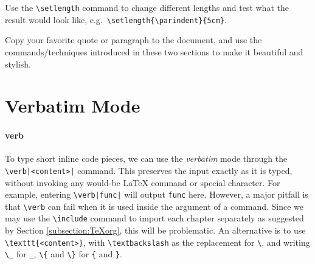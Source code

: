 \begin{exercisebox}
\begin{Exercise}
Use the \texttt{\textbackslash setlength} command to change different lengths and test what the result would look like, e.g.\ \texttt{\textbackslash setlength\{\textbackslash parindent\}\{5cm\}}.
\end{Exercise}
\begin{Exercise}
Copy your favorite quote or paragraph to the document, and use the commands/techniques introduced in these two sections to make it beautiful and stylish.    
\end{Exercise}
\end{exercisebox}

\section{Verbatim Mode}

\paragraph{verb}
To type short inline code pieces, we can use the \textit{verbatim} mode through the \texttt{\textbackslash verb|<content>|} command. This preserves the input exactly as it is typed, without invoking any would-be \LaTeX{} command or special character. For example, entering \texttt{\textbackslash verb|func|} will output \verb|func| here. However, a major pitfall is that \texttt{\textbackslash verb} can fail when it is used inside the argument of a command. Since we may use the \texttt{\textbackslash include} command to import each chapter separately as suggested by Section \ref{subsection:TeXorg}, this will be problematic. An alternative is to use \texttt{\textbackslash texttt\{<content>\}}, with \texttt{\textbackslash textbackslash} as the replacement for \texttt{\textbackslash}, and writing \texttt{\textbackslash \_} for \texttt{\_}, \texttt{\textbackslash \{} and \texttt{\textbackslash \}} for \texttt{\{} and \texttt{\}}. 

